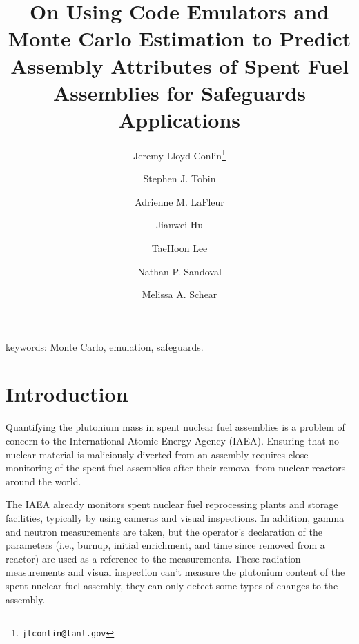 \documentclass{ansnse}
\author{Jeremy Lloyd Conlin\footnote{\texttt{jlconlin@lanl.gov}} }  %
\author{Stephen J. Tobin}   %
\author{Adrienne M. LaFleur}    %
\author{Jianwei Hu}         %
\author{TaeHoon Lee}        %
\author{Nathan P. Sandoval} %
\author{Melissa A. Schear}  %
\affil{\normalsize\emph{Los Alamos National Laboratory,
Los Alamos, NM 87544}}
\title{On Using Code Emulators and Monte Carlo Estimation to Predict Assembly Attributes of Spent Fuel Assemblies for Safeguards Applications}
\date{}
\begin{document}
\maketitle
keywords: Monte Carlo, emulation, safeguards.
  \doublespacing

\section{Introduction}\label{sec:Introduction}
Quantifying the plutonium mass in spent nuclear fuel assemblies is a problem of concern to the International Atomic Energy Agency (IAEA).  Ensuring that no nuclear material is maliciously diverted from an assembly requires close monitoring of the spent fuel assemblies after their removal from nuclear reactors around the world. 

The IAEA already monitors spent nuclear fuel reprocessing plants and storage facilities, typically by using cameras and visual inspections.  In addition, gamma and neutron measurements are taken, but the operator's declaration of the parameters (i.e., burnup, initial enrichment, and time since removed from a reactor) are used as a reference to the measurements.  These radiation measurements and visual inspection can't measure the plutonium content of the spent nuclear fuel assembly, they can only
detect some types of changes to the assembly.
\end{document}
